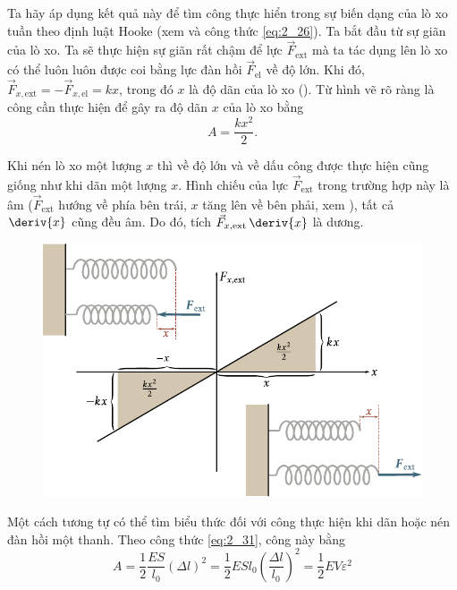Ta hãy áp dụng kết quả này để tìm công thực hiển trong sự biến dạng của lò xo tuần theo định luật Hooke   (xem  và công thức \eqref{eq:2_26}). Ta bắt đầu từ sự giãn của lò xo. Ta sẽ thực hiện sự giãn rất chậm để lực $\vec{F}_{\text{ext}}$ mà ta tác dụng lên lò xo có thể luôn luôn được coi bằng lực đàn hồi $\vec{F}_{\text{el}}$ về độ lớn. Khi đó, $\vec{F}_{x,\text{ext}}=-\vec{F}_{x,\text{el}}=kx$, trong đó  $x$ là độ dãn của lò xo (). Từ hình vẽ rõ ràng là công cần thực hiện để gây ra độ dãn $x$ của lò xo bằng
\begin{equation}\label{eq:3_13}
A = \frac{kx^2}{2}.
\end{equation}

\noindent
Khi nén lò xo một lượng $x$ thì về độ lớn và về dấu công được thực hiện cũng giống như khi dãn một lượng $x$. Hình chiếu của lực $\vec{F}_{\text{ext}}$ trong trường hợp này là âm ($\vec{F}_{\text{ext}}$ hướng về phía bên trái, $x$ tăng lên về bên phải, xem ), tất cả $\deriv{x}$ cũng đều âm. Do đó, tích $\vec{F}_{x,\text{ext}}\,\deriv{x}$ là dương.

\begin{figure}[!htb]
	\begin{center}
		\includegraphics[scale=0.95]{figures/ch_03/fig_3_2.pdf}
		\caption[]{}
		\label{fig:3_2}
	\end{center}
\end{figure}

Một cách tương tự có thể tìm biểu thức đối với công thực hiện khi dãn hoặc nén đàn hồi một thanh. Theo công thức \eqref{eq:2_31}, công này bằng
\begin{equation}\label{eq:3_14}
A = \frac{1}{2}\frac{ES}{l_0}(\Delta l)^2 = \frac{1}{2}ESl_0\left(\frac{\Delta l}{l_0}\right)^2 = \frac{1}{2}EV\varepsilon^2
\end{equation}

